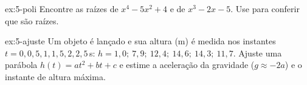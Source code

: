 \begin{exercicio}[polinômios]{ex:5-poli}
Encontre as raízes de $x^4-5x^2+4$ e de $x^3-2x-5$. Use  para conferir que são raízes.
\end{exercicio}

\begin{exercicio}{ex:5-ajuste}
Um objeto é lançado e sua altura (m) é medida nos instantes $t=0, 0{,}5, 1, 1{,}5, 2, 2{,}5$\,s:
$h=1{,}0;\ 7{,}9;\ 12{,}4;\ 14{,}6;\ 14{,}3;\ 11{,}7$. Ajuste uma parábola $h(t)=at^2+bt+c$ e estime a aceleração da
gravidade ($g\approx-2a$) e o instante de altura máxima.
\end{exercicio}
